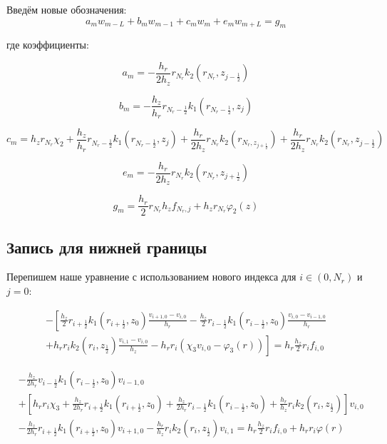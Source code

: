 Введём новые обозначения:
\[
  a_m w_{m - L} + b_m w_{m - 1} + c_m w_m + e_m w_{m + L} = g_m
\]

где коэффициенты:

\[
  a_m = - \frac{h_r}{2h_z} r_{N_r} k_2(r_{N_r}, z_{j - \frac{1}{2}})
\]

\[
  b_m = - \frac{h_z}{h_r} r_{N_r - \frac{1}{2}} k_1(r_{N_r - \frac{1}{2}}, z_j)
\]

\[
  c_m = h_z r_{N_r} \chi_2  + \frac{h_z}{h_r} r_{N_r - \frac{1}{2}} k_1(r_{N_r -\frac{1}{2}}, z_j)
  + \frac{h_r}{2 h_z} r_{N_r} k_2(r_{N_r, z_{j + \frac{1}{2}}})
  + \frac{h_r}{2 h_z} r_{N_r} k_2 (r_{N_r}, z_{j - \frac{1}{2}})
\]

\[
  e_m = - \frac{h_r}{2 h_z} r_{N_r} k_2(r_{N_r}, z_{j + \frac{1}{2}})
\]

\[
  g_m =\frac{h_r}{2} r_{N_r} h_z f_{N_r, j} + h_z r_{N_r} \varphi_2(z)
\]

\subsection{Запись для нижней границы}
Перепишем наше уравнение с использованием нового индекса для $i \in (0, N_r) $ и $ j = 0 $:

\begin{align*}
  - \left [ 
  \frac{h_z}{2} r_{i+\frac{1}{2}} k_1(r_{i+\frac{1}{2}}, z_0) \frac{v_{i+1, 0} - v_{i, 0}}{h_{r}}
  - \frac{h_z}{2} r_{i-\frac{1}{2}} k_1(r_{i-\frac{1}{2}}, z_0) \frac{v_{i, 0} - v_{i - 1, 0}}{h_{r}}
  \right . \\
  \left .
  + h_r r_{i} k_2(r_i, z_{\frac{1}{2}}) \frac{v_{i, 1} - v_{i, 0}}{h_{z}}
  - h_r r_i (\chi_3 v_{i, 0} - \varphi_3(r))
  \right ]  = h_r \frac{h_z}{2} r_i f_{i, 0}
\end{align*}

\begin{align*}
  &  - \frac{h_z}{2 h_r} v_{i - \frac{1}{2}} k_1(r_{i - \frac{1}{2}}, z_0) v_{i - 1, 0} \\
  & + \left[ 
    h_r r_i \chi_3 +\frac{h_z}{2 h_r} r_{i + \frac{1}{2}} k_1(r_{i + \frac{1}{2}}, z_0) + \frac{h_z}{2 h_r} r_{i - \frac{1}{2}} k_1(r_{i - \frac{1}{2}}, z_0)
    + \frac{h_r}{h_z} r_i k_2(r_i, z_{\frac{1}{2}}) 
  \right] v_{i, 0} \\
  & - \frac{h_z}{2 h_r} r_{i + \frac{1}{2}} k_1(r_{i + \frac{1}{2}}, z_0) v_{i + 1, 0} - \frac{h_r}{h_z} r_i k_2 (r_i, z_{\frac{1}{2}}) v_{i, 1}
  = h_r \frac{h_z}{2} r_i f_{i, 0} + h_r r_i \varphi(r)
\end{align*}

